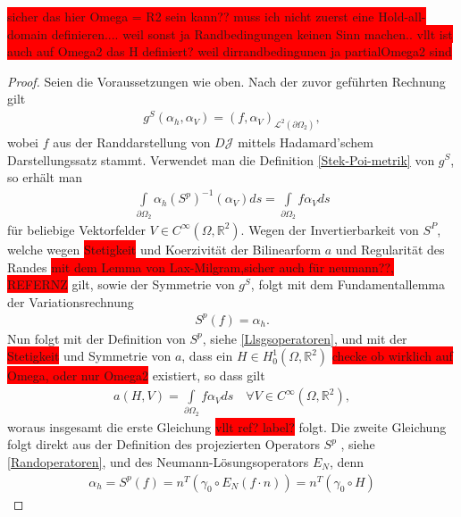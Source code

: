 \documentclass[bibliography=totoc,12pt,a4paper]{scrartcl}
\theoremstyle{exampstyle}
\numberwithin{equation}{section}
\begin{document}
\colorbox{red}{ sicher das hier Omega = R2 sein kann?? muss ich nicht zuerst eine Hold-all-domain definieren.... weil sonst ja Randbedingungen keinen Sinn machen.. vllt ist auch auf Omega2 das H definiert? weil dirrandbedingunen ja partialOmega2 sind}

\begin{proof}
Seien die Voraussetzungen wie oben. Nach der zuvor geführten Rechnung gilt
\begin{align*}
	g^S(\alpha_h, \alpha_V) = (f,\alpha_V)_{\mathcal{L}^2(\partial\Omega_2)},
\end{align*}
wobei $f$ aus der Randdarstellung von $D\mathcal{J}$ mittels Hadamard'schem Darstellungssatz stammt. Verwendet man die Definition \ref{Stek-Poi-metrik} von $g^S$, so erhält man
\begin{align*}
	\underset{\partial\Omega_2}{\int} \alpha_h (S^p)^{-1}(\alpha_V)ds = 				\underset{\partial\Omega_2}{\int} f \alpha_V ds
\end{align*}
für beliebige Vektorfelder $V\in C^\infty(\Omega, \mathbb{R}^2)$. Wegen der Invertierbarkeit von $S^P$, welche wegen \colorbox{red}{Stetigkeit} und Koerzivität der Bilinearform $a$ und Regularität des Randes \colorbox{red}{ mit dem Lemma von Lax-Milgram,sicher auch für neumann??, REFERNZ} gilt, sowie der Symmetrie von $g^S$, folgt mit dem Fundamentallemma der Variationsrechnung
\begin{align*}
	S^p(f) = \alpha_h.
\end{align*}
Nun folgt mit der Definition von $S^p$, siehe \ref{Llsgsoperatoren}, und mit der \colorbox{red}{Stetigkeit} und Symmetrie von $a$, dass ein $H \in H^1_0(\Omega,\mathbb{R}^2)$ \colorbox{red}{checke ob wirklich auf Omega, oder nur Omega2} existiert, so dass gilt
\begin{align*}
	a(H,V) = \underset{\partial\Omega_2}{\int} f \alpha_V ds \quad \forall V\in C^\infty(\Omega,\mathbb{R}^2),
\end{align*}
woraus insgesamt die erste Gleichung \colorbox{red}{vllt ref? label?} folgt. Die zweite Gleichung folgt direkt aus der Definition des projezierten Operators $S^p$ , siehe \ref{Randoperatoren}, und des Neumann-Lösungsoperators $E_N$, denn
\begin{align*}
	\alpha_h = S^p(f) = n^T(\gamma_0\circ E_N(f\cdot n)) = n^T(\gamma_0 \circ H)
\end{align*}
\end{proof}
\end{document}
